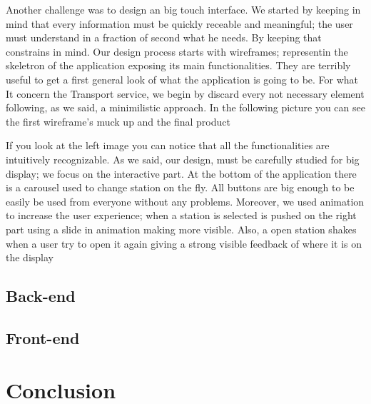 \documentclass[]{usiinfbachelorproject}
\begin{document}
Another challenge was to design an big touch interface. We started by keeping in mind that every information must be quickly receable and meaningful; the user must understand in a fraction of second what he needs. By keeping that constrains in mind.
Our design process starts with wireframes; representin the skeletron of the application exposing its main functionalities. They are terribly useful to get a first general look of what the application is going to be. For what It concern the Transport service, we begin by discard every not necessary element following, as we said, a minimilistic approach. In the following picture you can see the first wireframe's muck up and the final product
\begin{figure}[H]
  \centering
  \hfill
\end{figure} 
If you look at the left image you can notice that all the functionalities are intuitively recognizable. As we said, our design, must be carefully studied for big display; we focus on the interactive part.
At the bottom of the application there is a carousel used to change station on the fly. All buttons are big enough to be easily be used from everyone without any problems. Moreover, we used animation to increase the user experience; when a station is selected is pushed on the right part using a slide in animation making more visible. Also, a open station shakes when a user try to open it again giving a strong visible feedback of where it is on the display 
\subsection{Back-end}
\subsection{Front-end}
\section{Conclusion}
 
\newpage





\end{document}
